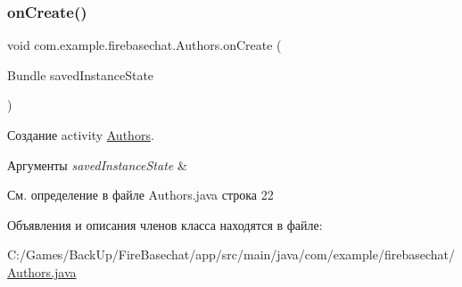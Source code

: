 \subsubsection{\texorpdfstring{on\+Create()}{onCreate()}}
{\footnotesize\ttfamily void com.\+example.\+firebasechat.\+Authors.\+on\+Create (\begin{DoxyParamCaption}\item[{Bundle}]{saved\+Instance\+State }\end{DoxyParamCaption})\hspace{0.3cm}{\ttfamily [protected]}}



Создание activity \mbox{\hyperlink{classcom_1_1example_1_1firebasechat_1_1_authors}{Authors}}. 


\begin{DoxyParams}{Аргументы}
{\em saved\+Instance\+State} & \\
\hline
\end{DoxyParams}


См. определение в файле Authors.\+java строка 22



Объявления и описания членов класса находятся в файле\+:\begin{DoxyCompactItemize}
\item 
C\+:/\+Games/\+Back\+Up/\+Fire\+Basechat/app/src/main/java/com/example/firebasechat/\mbox{\hyperlink{_authors_8java}{Authors.\+java}}\end{DoxyCompactItemize}
